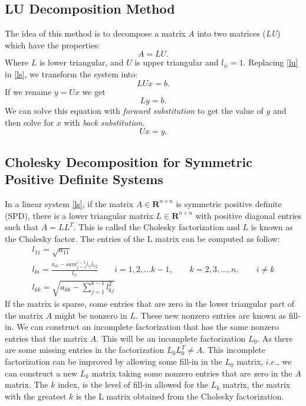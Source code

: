 \documentclass[12pt]{report}
\begin{document}
\subsection{LU Decomposition Method}
The idea of this method is to decompose a matrix \emph{A} into two matrices (\emph{LU}) which have the properties:
\begin{equation}\label{lu}
 A=LU.
\end{equation}
Where $L$ is lower triangular, and $U$ is upper triangular and $l_{ii}=1$.
Replacing \eqref{lu} in \eqref{ls}, we transform the system into:
\begin{equation*}
 LUx=b.
\end{equation*}
If we rename $y=Ux$ we get
\begin{equation*}
 Ly=b.
\end{equation*}
We can solve this equation with \emph{forward substitution} to get the value of $y$ and then solve for $x$ with \emph{back substitution}.
\begin{equation*}
 Ux=y.
\end{equation*}


\subsection{Cholesky Decomposition for Symmetric Positive Definite Systems}
In a linear system \eqref{ls}, if the matrix $ A \in \mathbf{R} ^{n\times n} $ is symmetric positive definite (SPD), there is a lower triangular matrix
$ L\in\mathbf{R}^{n\times n} $ with positive diagonal entries such that $ A=L{L}^{T} $. This is called the Cholesky factorization and $L$ is known as
the Cholesky factor.
The entries of the L matrix can be computed as follow:
\begin{gather*}
l_{11}=\sqrt{a_{11}}\\
l_{ki}=\frac{a_{ik}-sum_{j=1}^{i-1}l_{ij}l_{kj}}{l_{ii}}\qquad i=1,2,...k-1, \qquad k=2,3,...,n,\qquad i \neq k\\
l_{kk}=\sqrt{a_{kk}-\sum_{j=1}^{k-1}l_{kj}^2}
\end{gather*}
If the matrix is sparse, some entries that are zero in the lower triangular part of the matrix $A$ might be nonzero in $L$. These new nonzero entries are known as fill-in.
We can construct an incomplete factorization that has the same nonzero entries that the matrix $A$. This will be an incomplete factorization $L_0$. As there are
some missing entries in the factorization $L_0L_0^T\neq A$.
This incomplete factorization can be improved by allowing some fill-in in the $L_0$ matrix, $i.e.$, we can construct a new $L_k$ matrix taking some nonzero entries that are zero in the $A$ matrix.
The $k$ index, is the level of fill-in allowed for the $L_k$ matrix, the matrix with the greatest $k$ is the L matrix obtained from the Cholesky factorization.
\end{document}
